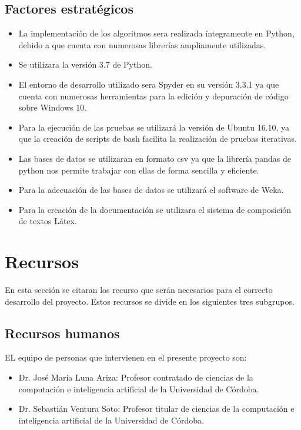\documentclass[a4paper, 12pt]{book}
\begin{document}
\subsection{Factores estratégicos}
\begin{itemize}

\item La implementación de los algoritmos sera realizada íntegramente en Python, debido a que cuenta con numerosas librerías ampliamente utilizadas.

\item Se utilizara la versión 3.7 de Python.

\item El entorno de desarrollo utilizado sera Spyder en su versión 3.3.1 ya que cuenta con numerosas herramientas para la edición y depuración de código sobre Windows 10.

\item Para la ejecución de las pruebas se utilizará la versión de Ubuntu 16.10, ya que la creación de scripts de bash facilita la realización de pruebas iterativas.

\item Las bases de datos se utilizaran en formato csv ya que la librería pandas de python nos permite trabajar con ellas de forma sencilla y eficiente.

\item Para la adecuación de las bases de datos se utilizará el software de Weka.

\item Para la creación de la documentación se utilizara el sistema de composición de textos Látex.

\end{itemize}

\newpage
\section{Recursos}
En esta sección se citaran los recurso que serán necesarios para el correcto desarrollo del proyecto. Estos recursos se divide en los siguientes tres subgrupos.
\subsection{Recursos humanos}

EL equipo de personas que intervienen en el presente proyecto son:
\begin{itemize}

    \item Dr. José María Luna Ariza: Profesor contratado de ciencias de la computación e inteligencia artificial de la Universidad de Córdoba.
    
    \item Dr. Sebastián Ventura Soto: Profesor titular de ciencias de la computación e inteligencia artificial de la Universidad de Córdoba.
    
\end{itemize}
\end{document}
